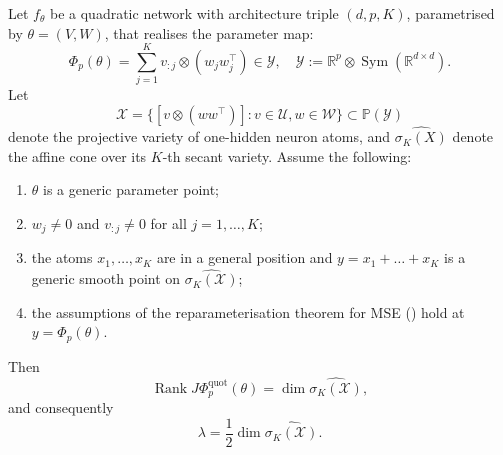 \begin{theorem}\label{thm: generic secant-dim LLC formula}
    Let $f_{\theta}$ be a quadratic network with architecture triple $(d,p,K)$, parametrised by $\theta =(V,W)$, that realises the parameter map:
    \begin{equation}
            \Phi_p(\theta)
    =
    \sum_{j=1}^K v_{:j}\otimes (w_j w_j^\top)
    \in \mathcal Y, \quad \mathcal{Y}:= \mathbb{R}^{p} \otimes \operatorname{Sym} (\mathbb{R}^{d \times d}).
    \end{equation}
    Let
    \begin{equation}
        \mathcal{X}= \{[v\otimes(ww^{\top})]: v\in \mathcal{U}, w\in \mathcal{W}\}
        \subset \mathbb{P}(\mathcal{Y})
    \end{equation}
    denote the projective variety of one-hidden neuron atoms, and $\widehat{\sigma_{K}(X)}$ denote the affine cone over its $K$-th secant variety.
    Assume the following:
    \begin{enumerate}
        \item $\theta$ is a generic parameter point;
        \item $w_{j} \not = 0$ and $v_{:j} \not =0$ for all $j=1,\dots, K$;
        \item the atoms $x_{1},\dots, x_{K}$ are in a general position and $y=x_{1}+\dots + x_{K}$ is a generic smooth point on $\widehat{\sigma_{K}(\mathcal X)}$;
        \item the assumptions of the reparameterisation theorem for MSE () hold at $y=\Phi_{p}(\theta)$.
    \end{enumerate}
    Then
    \begin{equation}
        \operatorname{Rank} J \Phi_{p}^{\operatorname{quot}}(\theta) = \dim \widehat{\sigma_{K}(\mathcal X)},
    \end{equation}
    and consequently
    \begin{equation}
        \lambda = \frac{1}{2} \dim \widehat{\sigma_{K}(\mathcal X)}.
    \end{equation}
\end{theorem}

